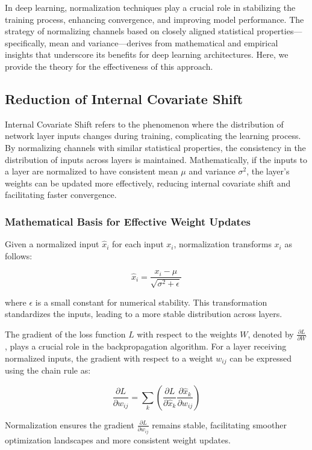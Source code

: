 In deep learning, normalization techniques play a crucial role in stabilizing the training process, enhancing convergence, and improving model performance. The strategy of normalizing channels based on closely aligned statistical properties—specifically, mean and variance—derives from mathematical and empirical insights that underscore its benefits for deep learning architectures. Here, we provide the theory for the effectiveness of this approach.

\subsection{Reduction of Internal Covariate Shift}
Internal Covariate Shift refers to the phenomenon where the distribution of network layer inputs changes during training, complicating the learning process. By normalizing channels with similar statistical properties, the consistency in the distribution of inputs across layers is maintained. Mathematically, if the inputs to a layer are normalized to have consistent mean \(\mu\) and variance \(\sigma^2\), the layer's weights can be updated more effectively, reducing internal covariate shift and facilitating faster convergence.

\subsubsection{Mathematical Basis for Effective Weight Updates}

Given a normalized input \(\hat{x}_i\) for each input \(x_i\), normalization transforms \(x_i\) as follows:

\[
\hat{x}_i = \frac{x_i - \mu}{\sqrt{\sigma^2 + \epsilon}}
\]

where \(\epsilon\) is a small constant for numerical stability. This transformation standardizes the inputs, leading to a more stable distribution across layers.

The gradient of the loss function \(L\) with respect to the weights \(W\), denoted by \(\frac{\partial L}{\partial W}\), plays a crucial role in the backpropagation algorithm. For a layer receiving normalized inputs, the gradient with respect to a weight \(w_{ij}\) can be expressed using the chain rule as:

\[
\frac{\partial L}{\partial w_{ij}} = \sum_k \left( \frac{\partial L}{\partial \hat{x}_k} \frac{\partial \hat{x}_k}{\partial w_{ij}} \right)
\]

Normalization ensures the gradient \(\frac{\partial L}{\partial w_{ij}}\) remains stable, facilitating smoother optimization landscapes and more consistent weight updates.

